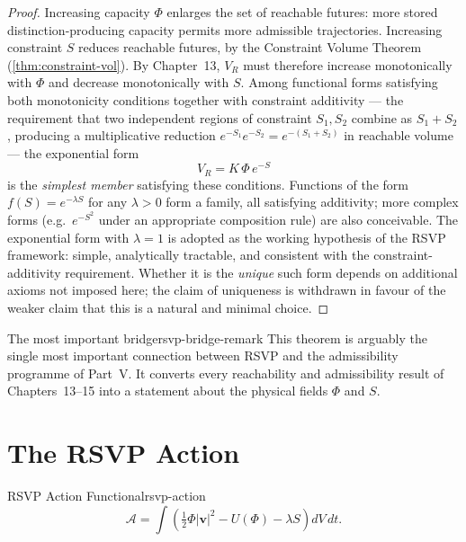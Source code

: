 \documentclass[12pt,twoside,openright]{book}
\begin{document}
\begin{proof}
  Increasing capacity $\Phi$ enlarges the set of reachable
  futures: more stored distinction-producing capacity
  permits more admissible trajectories. Increasing
  constraint $S$ reduces reachable futures, by the
  Constraint Volume Theorem (\cref{thm:constraint-vol}).
  By Chapter~13, $V_R$ must therefore increase monotonically
  with $\Phi$ and decrease monotonically with $S$. Among
  functional forms satisfying both monotonicity conditions
  together with constraint additivity --- the requirement
  that two independent regions of constraint $S_1, S_2$
  combine as $S_1 + S_2$, producing a multiplicative
  reduction $e^{-S_1}e^{-S_2} = e^{-(S_1+S_2)}$ in
  reachable volume --- the exponential form
  \[
    V_R = K\, \Phi\, e^{-S}
  \]
  is the \emph{simplest member} satisfying these
  conditions. Functions of the form
  $f(S) = e^{-\lambda S}$ for any $\lambda > 0$ form a
  family, all satisfying additivity; more complex forms
  (e.g.\ $e^{-S^2}$ under an appropriate composition rule)
  are also conceivable. The exponential form with
  $\lambda = 1$ is adopted as the working hypothesis of
  the RSVP framework: simple, analytically tractable,
  and consistent with the constraint-additivity
  requirement. Whether it is the \emph{unique} such form
  depends on additional axioms not imposed here; the
  claim of uniqueness is withdrawn in favour of the
  weaker claim that this is a natural and minimal choice.
\end{proof}

\begin{remark}{The most important bridge}{rsvp-bridge-remark}
  This theorem is arguably the single most important
  connection between RSVP and the admissibility programme
  of Part~V. It converts every reachability and
  admissibility result of Chapters~13--15 into a statement
  about the physical fields $\Phi$ and $S$.
\end{remark}

\section{The RSVP Action}
\label{sec:ch16-action}

\begin{definition}{RSVP Action Functional}{rsvp-action}
  \[
    \mathcal{A}
    = \int \left(
        \tfrac{1}{2}\Phi|\mathbf{v}|^2
        - U(\Phi)
        - \lambda S
      \right) dV \, dt.
  \]
\end{definition}
\end{document}
